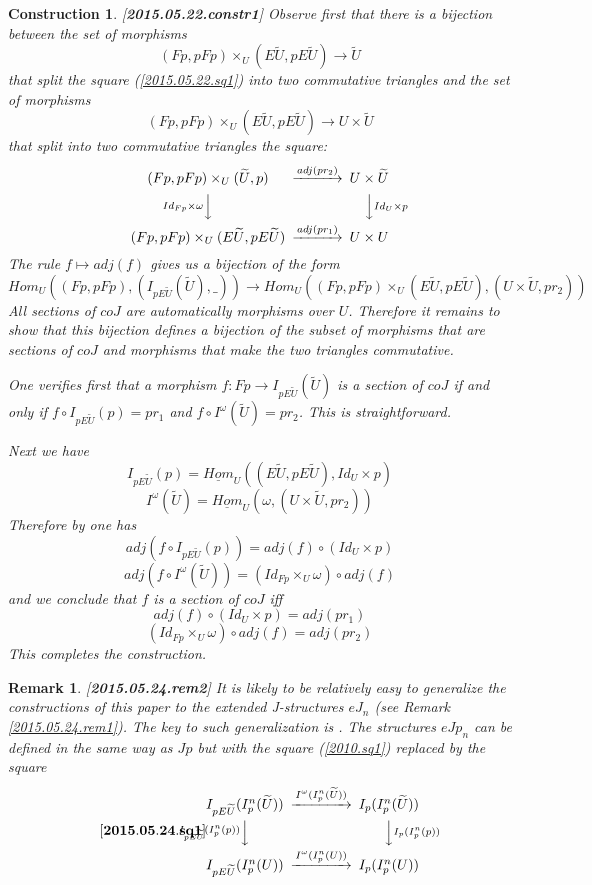 \documentclass[12pt]{article}
\newenvironment{eq}{\begin{equation}}{\end{equation}}
\newtheorem{remark}[proposition]{Remark}
\newtheorem{construction}[proposition]{Construction}
\newcommand{\llabel}[1]{\label{#1}[{\bf #1}]}
\newcommand{\sr}{\rightarrow}
\newcommand{\uu}{\underline}
\newcommand{\wt}{\widetilde}
\begin{document}
\begin{construction}\rm
\llabel{2015.05.22.constr1}
Observe first that there is a bijection between the set of morphisms 
%
$$(Fp,pFp)\times_U(E\wt{U},pE\wt{U})\sr \wt{U}$$
%
that split the square (\ref{2015.05.22.sq1}) into two commutative triangles and the set of morphisms 
%
$$(Fp,pFp)\times_U(E\wt{U},pE\wt{U})\sr U\times\wt{U}$$
%
that split into two commutative triangles the square:
%
$$
\begin{CD}
(Fp,pFp)\times_U(\wt{U},p) @>adj(pr_2)>> U\times\wt{U}\\
@VId_{Fp}\times \omega VV @VV Id_U\times p V\\
(Fp,pFp)\times_U(E\wt{U},pE\wt{U}) @>adj(pr_1)>> U\times U
\end{CD}
$$
%
The rule $f\mapsto adj(f)$ gives us a bijection of the form
%
$$Hom_U((Fp,pFp),(I_{pE\wt{U}}(\wt{U}),\_))\sr Hom_U((Fp,pFp)\times_U (E\wt{U},pE\wt{U}), (U\times\wt{U}, pr_2))$$
%
All sections of $coJ$ are automatically morphisms over $U$. Therefore it remains to show that this bijection defines a bijection of the subset of morphisms that are sections of $coJ$ and morphisms that make the two triangles commutative. 

One verifies first that a morphism $f:Fp\sr I_{pE\wt{U}}(\wt{U})$ is a section of $coJ$ if and only if $f\circ I_{pE\wt{U}}(p)=pr_1$ and $f\circ I^{\omega}(\wt{U})=pr_2$. This is straightforward. 

Next we have
%
$$I_{pE\wt{U}}(p)=\uu{Hom}_U((E\wt{U},pE\wt{U}),Id_U\times p)$$
$$I^{\omega}(\wt{U})=\uu{Hom}_U(\omega,(U\times\wt{U},pr_2))$$
%
Therefore by \cite[Lemma 8.7]{fromunivwithPi} one has
%
$$adj(f\circ I_{pE\wt{U}}(p))=adj(f)\circ (Id_U\times p)$$
$$adj(f\circ I^{\omega}(\wt{U}))=(Id_{Fp}\times_{U}\omega)\circ adj(f)$$
%
and we conclude that $f$ is a section of $coJ$ iff 
%
$$adj(f)\circ (Id_U\times p)=adj(pr_1)$$
$$(Id_{Fp}\times_{U}\omega)\circ adj(f)=adj(pr_2)$$
% 
This completes the construction.
\end{construction}
%
\begin{remark}\rm
\llabel{2015.05.24.rem2}
It is likely to be relatively easy to generalize the constructions of this  paper to the extended J-structures $eJ_n$ (see Remark \ref{2015.05.24.rem1}). The key to such generalization is \cite[Remark 3.12]{fromunivwithPi}. The structures $eJp_n$ can be defined in the same way as $Jp$ but with the square (\ref{2010.sq1}) replaced by the square
%
\begin{eq}
\llabel{2015.05.24.sq1}
\begin{CD}
I_{pE\wt{U}}(I_p^n(\wt{U})) @>I^{\omega}(I_p^n(\wt{U}))>> I_p(I_p^n(\wt{U}))\\
@VI_{pE\wt{U}}(I_p^n(p)) VV @VV I_p(I_p^n(p))V\\
I_{pE\wt{U}}(I_p^n(U)) @>I^{\omega}(I_p^n(U))>> I_p(I_p^n(U))
\end{CD}
\end{eq}
\end{remark}
%
\end{document}
